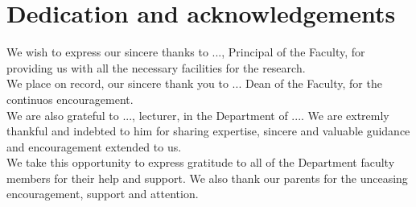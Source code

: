 
\chapter*{Dedication and acknowledgements}
\begin{SingleSpace}
We wish to express our sincere thanks to ..., Principal of the Faculty, for
providing us with all the necessary facilities for the research.
\\

We place on record, our sincere thank you to ... Dean of the Faculty, for the
continuos encouragement.
\\

We are also grateful to ..., lecturer, in the Department of .... We are extremly
thankful and indebted to him for sharing expertise, sincere and valuable
guidance and encouragement extended to us.
\\

We take this opportunity to express gratitude to all of the Department faculty
members for their help and support. We also thank our parents for the unceasing
encouragement, support and attention.

 \end{SingleSpace} \clearpage